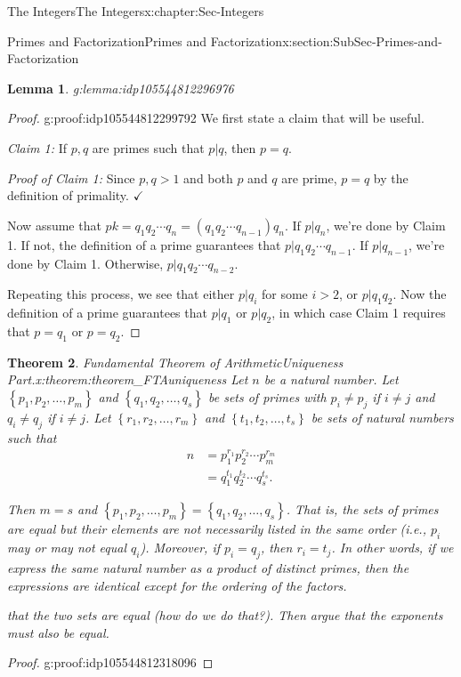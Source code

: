 \documentclass[oneside,10pt,]{book}
\numberwithin{equation}{section}
\newcommand{\set}[1]{\left\{ {#1} \right\}}
\newtheorem{theorem}{Theorem}[section]
\newtheorem{lemma}[theorem]{Lemma}
\newcommand{\amp}{&}
\begin{document}
\begin{chapterptx}{The Integers}{}{The Integers}{}{}{x:chapter:Sec-Integers}
\begin{sectionptx}{Primes and Factorization}{}{Primes and Factorization}{}{}{x:section:SubSec-Primes-and-Factorization}
\begin{lemma}{}{}{g:lemma:idp105544812296976}
\end{lemma}
\begin{proof}{}{g:proof:idp105544812299792}
We first state a claim that will be useful.%
\par
\emph{Claim 1:} If \(p,q\) are primes such that \(p|q\), then \(p = q\).%
\par
\emph{Proof of Claim 1:} Since \(p,
q > 1\) and both \(p\) and \(q\) are prime, \(p = q\) by the definition of primality. \(\checkmark\)%
\par
Now assume that \(pk = q_1 q_2 \cdots q_n = (q_1 q_2 \cdots q_{n-1}) q_n\). If \(p|q_n\), we're done by Claim 1. If not, the definition of a prime guarantees that \(p| q_1 q_2 \cdots q_{n-1}\). If \(p|q_{n-1}\), we're done by Claim 1. Otherwise, \(p|q_1 q_2 \cdots q_{n-2}\).%
\par
Repeating this process, we see that either \(p|q_i\) for some \(i > 2\), or \(p|q_1 q_2\). Now the definition of a prime guarantees that \(p|q_1\) or \(p|q_2\), in which case Claim 1 requires that \(p = q_1\) or \(p = q_2\).%
\end{proof}
\begin{theorem}{Fundamental Theorem of Arithmetic\textendash{}Uniqueness Part.}{}{x:theorem:theorem_FTAuniqueness}%
Let \(n\) be a natural number. Let \(\set{p_1,p_2,\ldots,p_m}\) and \(\set{q_1,q_2,\ldots,q_s}\) be sets of primes with \(p_i\ne p_j\) if \(i\ne j\) and \(q_i\ne q_j\) if \(i\ne j\). Let \(\set{r_1,r_2,\ldots,r_m}\) and \(\set{t_1,t_2,\ldots,t_s}\) be sets of natural numbers such that%
\begin{align*}
n \amp = p_1^{r_1} p_2^{r_2} \cdots p_m^{r_m}\\
\amp = q_1^{t_1} q_2^{t_2} \cdots q_s^{t_s}\text{.}
\end{align*}
%
\par
Then \(m = s\) and \(\set{p_1,p_2,\ldots,p_m} = \set{q_1,q_2,\ldots,q_s}\). That is, the sets of primes are equal but their elements are not necessarily listed in the same order (i.e., \(p_i\) may or may not equal \(q_i\)). Moreover, if \(p_i = q_j\), then \(r_i = t_j\). In other words, if we express the same natural number as a product of distinct primes, then the expressions are identical except for the ordering of the factors.%
\par\smallskip%
\noindentArgue that the two sets are equal (how do we do that?). Then argue that the exponents must also be equal.%
\end{theorem}
\begin{proof}{}{g:proof:idp105544812318096}

\end{proof}
\end{sectionptx}
\end{chapterptx}
\end{document}
